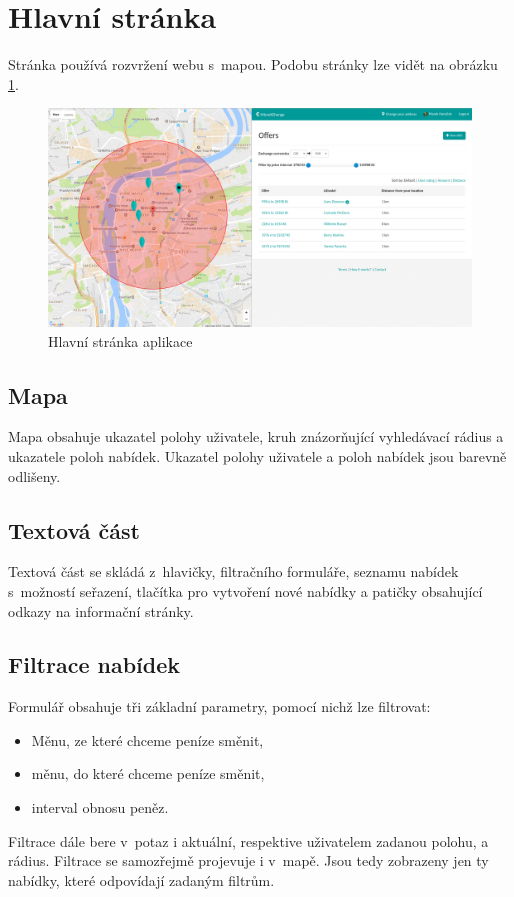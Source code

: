 \section{Hlavní stránka}

\label{nur:homepage}
Stránka používá rozvržení webu s~mapou. Podobu stránky lze vidět na obrázku \ref{fig:tur:homepage}.

\begin{figure}[!h]
    \centering
    \includegraphics[width=1.0\textwidth]{media/tur/homepage.png}
    \caption{Hlavní stránka aplikace}
    \label{fig:tur:homepage}
\end{figure}

\subsection{Mapa}
Mapa obsahuje ukazatel polohy uživatele, kruh znázorňující vyhledávací rádius a ukazatele poloh nabídek. Ukazatel polohy uživatele a poloh nabídek jsou barevně odlišeny.

\subsection{Textová část}
Textová část se skládá z~hlavičky, filtračního formuláře, seznamu nabídek s~možností seřazení, tlačítka pro vytvoření nové nabídky a patičky obsahující odkazy na informační stránky.

\subsection{Filtrace nabídek}
Formulář obsahuje tři základní parametry, pomocí nichž lze filtrovat:
\begin{itemize}
	\item Měnu, ze které chceme peníze směnit,
	\item měnu, do které chceme peníze směnit,
	\item interval obnosu peněz.
\end{itemize}
Filtrace dále bere v~potaz i aktuální, respektive uživatelem zadanou polohu, a rádius. Filtrace se samozřejmě projevuje i v~mapě. Jsou tedy zobrazeny jen ty nabídky, které odpovídají zadaným filtrům.

